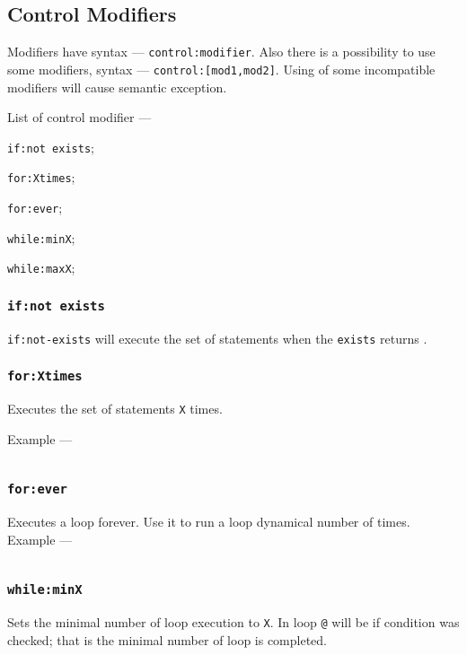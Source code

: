 \subsection{Control Modifiers}

Modifiers have syntax — \texttt{control:modifier}. Also there is a possibility to use some modifiers, syntax — \texttt{control:[mod1,mod2]}. Using of some incompatible modifiers will cause semantic exception.

List of control modifier —
\begin{icItems}
	\item \texttt{if:not exists};
	\item \texttt{for:Xtimes};
	\item \texttt{for:ever};
	\item \texttt{while:minX};
	\item \texttt{while:maxX};
\end{icItems}

\subsubsection{\texttt{if:not exists}}

\texttt{if:not-exists} will execute the set of statements when the \texttt{exists} returns \void.

\subsubsection{\texttt{for:Xtimes}}

Executes the set of statements \texttt{X} times.

Example —
\inputminted[linenos]{icl}{../sources/forxtimes.icL}

\subsubsection{\texttt{for:ever}}

Executes a loop forever. Use it to run a loop dynamical number of times. Example —
\inputminted[linenos]{icl}{../sources/foreverloop.icL}

\subsubsection{\texttt{while:minX}}

Sets the minimal number of loop execution to \texttt{X}. In loop \texttt{@} will be \true{} if condition was checked; that is the minimal number of loop is completed.

